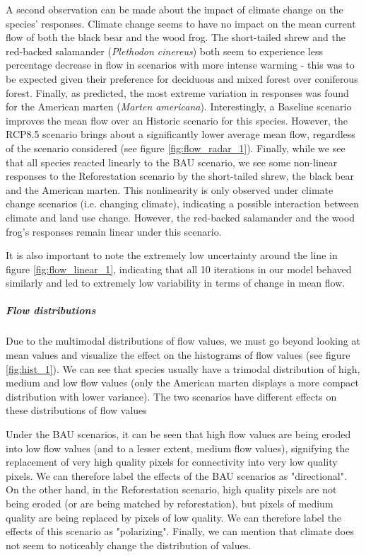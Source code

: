 A second observation can be made about the impact of climate change on the species' responses. Climate change seems to have no impact on the mean current flow of both the black bear and the wood frog. The short-tailed shrew and the red-backed salamander (\textit{Plethodon cinereus}) both seem to experience less percentage decrease in flow in scenarios with more intense warming - this was to be expected given their preference for deciduous and mixed forest over coniferous forest. Finally, as predicted, the most extreme variation in responses was  found for the American marten (\textit{Marten americana}). Interestingly, a Baseline scenario improves the mean flow over an Historic scenario for this species. However, the RCP8.5 scenario brings about a significantly lower average mean flow, regardless of the scenario considered (see figure \ref{fig:flow_radar_1}).
Finally, while we see that all species reacted linearly to the BAU scenario, we see some non-linear responses to the Reforestation scenario by the short-tailed shrew, the black bear and the American marten. This nonlinearity is only observed under climate change scenarios (i.e. changing climate), indicating a possible interaction between climate and land use change. However, the red-backed salamander and the wood frog's responses remain linear under this scenario.

It is also important to note the extremely low uncertainty around the line in figure \ref{fig:flow_linear_1}, indicating that all 10 iterations in our model behaved similarly and led to extremely low variability in terms of change in mean flow.

\vspace{1em}

\subparagraph*{\textit{Flow distributions}} Due to the multimodal distributions of flow values, we must go beyond looking at mean values and visualize the effect on the histograms of flow values (see figure \ref{fig:hist_1}). We can see that species usually have a trimodal distribution of high, medium and low flow values (only the American marten displays a more compact distribution with lower variance). The two scenarios have different effects on these distributions of flow values

Under the BAU scenarios, it can be seen that high flow values are being eroded into low flow values (and to a lesser extent, medium flow values), signifying the replacement of very high quality pixels for connectivity into very low quality pixels. We can therefore label the effects of the BAU scenarios as "directional". On the other hand, in the Reforestation scenario, high quality pixels are not being eroded (or are being matched by reforestation), but pixels of medium quality are being replaced by pixels of low quality. We can therefore label the effects of this scenario as "polarizing". Finally, we can mention that climate does not seem to noticeably change the distribution of values.

